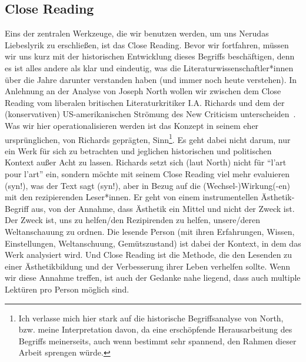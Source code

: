 \begin{comment}
[Beehler1988]
"Consequently, what we teach in the English class-
room is not "literature" but ways of reading. By
helping students to identify different methods,
different positions from which to view a work, we
help them to realize that texts do not "reveal"
truth: they simply provide the field upon which
meanings can be produced."
\end{comment}

\subsection{Close Reading}

Eins der zentralen Werkzeuge, die wir benutzen werden, um uns Nerudas Liebeslyrik zu erschließen, ist das Close Reading.
Bevor wir fortfahren, müssen wir uns kurz mit der historischen Entwicklung dieses Begriffs beschäftigen, denn es ist alles andere als klar und eindeutig, was die Literaturwissenschaftler*innen über die Jahre darunter verstanden haben (und immer noch heute verstehen).
In Anlehnung an der Analyse von Joseph North wollen wir zwischen dem Close Reading vom liberalen britischen Literaturkritiker I.A. Richards und dem der (konservativen) US-amerikanischen Strömung des New Criticism unterscheiden~\autocite{North2013}.
Was wir hier operationalisieren werden ist das Konzept in seinem eher ursprünglichen, von Richards geprägten, Sinn\footnote{Ich verlasse mich hier stark auf die historische Begriffsanalyse von North, bzw. meine Interpretation davon, da eine erschöpfende Herausarbeitung des Begriffs meinerseits, auch wenn bestimmt sehr spannend, den Rahmen dieser Arbeit sprengen würde.}.
Es geht dabei nicht darum, nur ein Werk für sich zu betrachten und jeglichen historischen und politischen Kontext außer Acht zu lassen.
Richards setzt sich (laut North) nicht für ``l'art pour l'art'' ein, sondern möchte mit seinem Close Reading viel mehr evaluieren (syn!), was der Text sagt (syn!), aber in Bezug auf die (Wechsel-)Wirkung(-en) mit den rezipierenden Leser*innen.
Er geht von einem instrumentellen Ästhetik-Begriff aus, von der Annahme, dass Ästhetik ein Mittel und nicht der Zweck ist.
Der Zweck ist, uns zu helfen/den Rezipirenden zu helfen, unsere/deren Weltanschauung zu ordnen.
Die lesende Person (mit ihren Erfahrungen, Wissen, Einstellungen, Weltanschuung, Gemütszustand) ist dabei der Kontext, in dem das Werk analysiert wird.
Und Close Reading ist die Methode, die den Lesenden zu einer Ästhetikbildung und der Verbesserung ihrer Leben verhelfen sollte.
Wenn wir diese Annahme treffen, ist auch der Gedanke nahe liegend, dass auch multiple Lektüren pro Person möglich sind.

